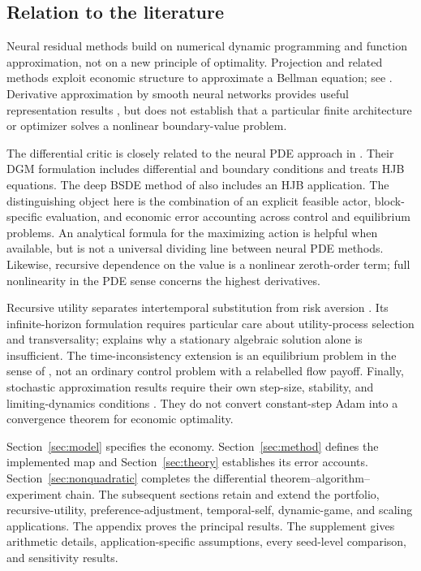 \documentclass[ecta,draft]{econsocart}
\theoremstyle{definition}
\theoremstyle{remark}
\begin{document}
\subsection{Relation to the literature}
Neural residual methods build on numerical dynamic programming and function approximation, not on a new principle of optimality. Projection and related methods exploit economic structure to approximate a Bellman equation; see \citet{judd1998}. Derivative approximation by smooth neural networks provides useful representation results \citep{hornik1990}, but does not establish that a particular finite architecture or optimizer solves a nonlinear boundary-value problem.

The differential critic is closely related to the neural PDE approach in \citet{sirignano2018}. Their DGM formulation includes differential and boundary conditions and treats HJB equations. The deep BSDE method of \citet{han2018} also includes an HJB application. The distinguishing object here is the combination of an explicit feasible actor, block-specific evaluation, and economic error accounting across control and equilibrium problems. An analytical formula for the maximizing action is helpful when available, but is not a universal dividing line between neural PDE methods. Likewise, recursive dependence on the value is a nonlinear zeroth-order term; full nonlinearity in the PDE sense concerns the highest derivatives.

Recursive utility separates intertemporal substitution from risk aversion \citep{epsteinzin1989,duffieepstein1992}. Its infinite-horizon formulation requires particular care about utility-process selection and transversality; \citet{herdegen2021} explains why a stationary algebraic solution alone is insufficient. The time-inconsistency extension is an equilibrium problem in the sense of \citet{bjork2016}, not an ordinary control problem with a relabelled flow payoff. Finally, stochastic approximation results require their own step-size, stability, and limiting-dynamics conditions \citep{borkar2024}. They do not convert constant-step Adam into a convergence theorem for economic optimality.

Section~\ref{sec:model} specifies the economy. Section~\ref{sec:method} defines the implemented map and Section~\ref{sec:theory} establishes its error accounts. Section~\ref{sec:nonquadratic} completes the differential theorem--algorithm--experiment chain. The subsequent sections retain and extend the portfolio, recursive-utility, preference-adjustment, temporal-self, dynamic-game, and scaling applications. The appendix proves the principal results. The supplement gives arithmetic details, application-specific assumptions, every seed-level comparison, and sensitivity results.
\end{document}
